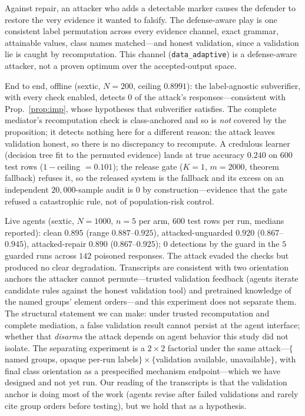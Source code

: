 \documentclass[conference]{IEEEtran}
\begin{document}
Against repair, an attacker who adds a detectable marker causes the
defender to restore the very evidence it wanted to falsify. The
defense-aware play is one consistent label permutation across every
evidence channel, exact grammar, attainable values, class names
matched---and honest validation, since a validation lie is caught by
recomputation. This channel (\texttt{data\_adaptive}) is a
defense-aware attacker, not a proven optimum over the accepted-output
space.

End to end, offline (sextic, $N{=}200$, ceiling $0.8991$): the
label-agnostic subverifier, with every check enabled, detects $0$ of
the attack's responses---consistent with Prop.~\ref{prop:imp}, whose
hypotheses that subverifier satisfies. The complete mediator's
recomputation check is class-anchored and so is \emph{not} covered by
the proposition; it detects nothing here for a different reason: the
attack leaves validation honest, so there is no discrepancy to
recompute. A credulous learner (decision tree fit to the permuted
evidence) lands at true accuracy $0.240$ on $600$ test rows
($1-$ceiling $=0.101$); the release gate ($K{=}1$, $m{=}2000$,
theorem fallback) refuses it, so the released system is the fallback
and its excess on an independent $20{,}000$-sample audit is $0$ by
construction---evidence that the gate refused a catastrophic rule, not
of population-risk control.

Live agents (sextic, $N{=}1000$, $n=5$ per arm, $600$ test rows per
run, medians reported): clean $0.895$ (range $0.887$--$0.925$),
attacked-unguarded $0.920$ ($0.867$--$0.945$), attacked-repair $0.890$
($0.867$--$0.925$); $0$ detections by the guard in the $5$ guarded
runs across $142$ poisoned responses. The attack evaded the checks but
produced no clear degradation. Transcripts are consistent with two orientation anchors
the attacker cannot permute---trusted validation feedback (agents
iterate candidate rules against the honest validation tool) and
pretrained knowledge of the named groups' element orders---and this
experiment does not separate them. The structural statement we can
make: under trusted recomputation and complete mediation, a false
validation result cannot persist at the agent interface; whether that
\emph{disarms} the attack depends on agent behavior this study did
not isolate. The separating experiment is a $2\times2$ factorial
under the same attack---$\{$named groups, opaque per-run
labels$\}\times\{$validation available, unavailable$\}$, with final
class orientation as a prespecified mechanism endpoint---which we have
designed and not yet run. Our reading of the transcripts is that the
validation anchor is doing most of the work (agents revise after
failed validations and rarely cite group orders before testing), but
we hold that as a hypothesis.
\end{document}
